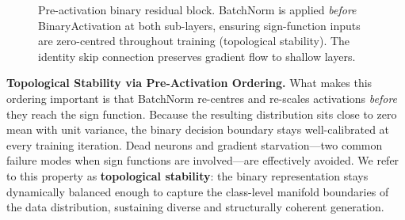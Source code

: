 \documentclass[conference]{IEEEtran}
\begin{document}
\begin{figure}[t]
\centering

\caption{Pre-activation binary residual block. BatchNorm is applied \emph{before}
BinaryActivation at both sub-layers, ensuring sign-function inputs are
zero-centred throughout training (topological stability). The identity skip
connection preserves gradient flow to shallow layers.}
\label{fig:block}
\end{figure}

\textbf{Topological Stability via Pre-Activation Ordering.} What makes this ordering
important is that BatchNorm re-centres and re-scales activations \emph{before} they
reach the sign function.  Because the resulting distribution sits close to zero mean
with unit variance, the binary decision boundary stays well-calibrated at every
training iteration. Dead neurons and gradient starvation---two common failure modes when
sign functions are involved---are effectively avoided. We refer to this property as
\textbf{topological stability}: the binary representation stays dynamically balanced
enough to capture the class-level manifold boundaries of the data distribution,
sustaining diverse and structurally coherent generation.
\end{document}
